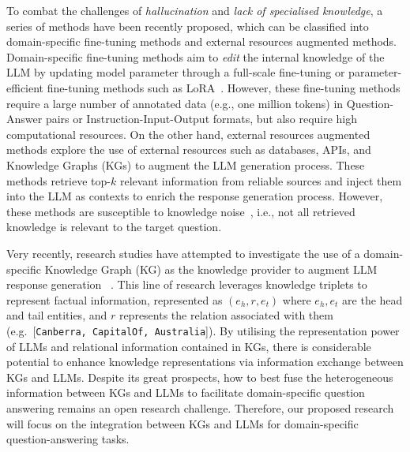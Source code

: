 To combat the challenges of \emph{hallucination} and \emph{lack of specialised knowledge}, a series of methods have been recently proposed, which can be classified into domain-specific fine-tuning methods and external resources augmented methods. Domain-specific fine-tuning methods aim to \emph{edit} the internal knowledge of the LLM by updating model parameter through a full-scale fine-tuning or parameter-efficient fine-tuning methods such as LoRA~\parencite{lora}.
However, these fine-tuning methods require a large number of annotated data (e.g., one million tokens) in Question-Answer pairs or Instruction-Input-Output formats, but also require high computational resources. On the other hand, external resources augmented methods explore the use of external resources such as databases, APIs, and Knowledge Graphs (KGs) to augment the LLM generation process. These methods retrieve top-$k$ relevant information from reliable sources and inject them into the LLM as contexts to enrich the response generation process.
However, these methods are susceptible to knowledge noise~\parencite{kbert}, i.e., not all retrieved knowledge is relevant to the target question.

Very recently, research studies have attempted to investigate the use of a domain-specific Knowledge Graph (KG) as the knowledge
provider to augment LLM response generation ~\parencite{gnp, graph-prompter, kalm-prompting}.
This line of research leverages knowledge triplets to represent factual information, represented as $(e_h, r, e_t)$ where $e_h, e_t$ are the head and tail entities, and $r$ represents the relation associated with them (e.g.\ [\texttt{Canberra, CapitalOf, Australia}]).
By utilising the representation power of LLMs and relational information contained in KGs, there is considerable potential to enhance knowledge representations via information exchange between KGs and LLMs. Despite its great prospects, how to best fuse the heterogeneous information between KGs and LLMs to facilitate domain-specific question answering remains an open research challenge. Therefore, our proposed research will focus on the integration between KGs and LLMs for domain-specific question-answering tasks. 


